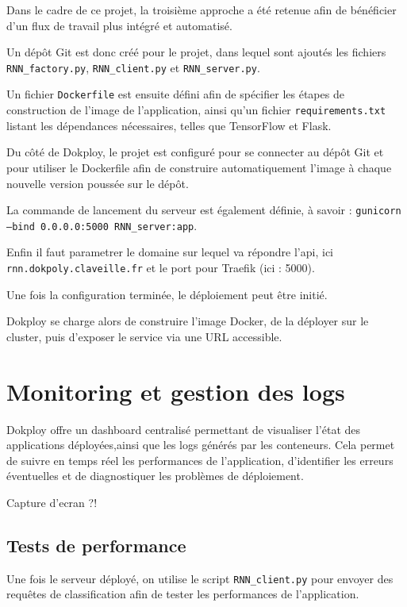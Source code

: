 \documentclass{rapportClass} %
\begin{document}
\smallskip
Dans le cadre de ce projet, la troisième approche a été retenue afin
de bénéficier d’un flux de travail plus intégré et automatisé.

\smallskip
Un dépôt Git est donc créé pour le projet, dans lequel sont ajoutés
les fichiers \texttt{RNN\_factory.py}, \texttt{RNN\_client.py} et
\texttt{RNN\_server.py}.

\smallskip
Un fichier \texttt{Dockerfile} est ensuite défini afin de spécifier
les étapes de construction de l’image de l’application, ainsi qu’un
fichier \texttt{requirements.txt} listant les dépendances nécessaires,
telles que TensorFlow et Flask.


\smallskip
Du côté de Dokploy, le projet est configuré pour se connecter au dépôt
Git et pour utiliser le Dockerfile afin de construire automatiquement
l’image à chaque nouvelle version poussée sur le dépôt.

\smallskip
La commande de lancement du serveur est également définie, à savoir :
\texttt{gunicorn --bind 0.0.0.0:5000 RNN\_server:app}.

\smallskip
Enfin il faut parametrer le domaine sur lequel va répondre l'api, ici %
\texttt{rnn.dokpoly.claveille.fr} et le port pour Traefik (ici : 5000).

\smallskip
Une fois la configuration terminée, le déploiement peut être
initié.

\smallskip
Dokploy se charge alors de construire l’image Docker, de la
déployer sur le cluster, puis d’exposer le service via une URL
accessible.

\section{Monitoring et gestion des logs}
Dokploy offre un dashboard centralisé permettant de visualiser l'état des applications déployées,ainsi que les 
logs générés par les conteneurs. Cela permet de suivre en temps réel les performances de l'application, 
d'identifier les erreurs éventuelles et de diagnostiquer les problèmes de déploiement. 


{\color{red} Capture d'ecran ?!}
\subsection{Tests de performance}
Une fois le serveur déployé, on utilise le script \texttt{RNN\_client.py} pour envoyer des requêtes de classification 
afin de tester les performances de l’application. 
\end{document}
